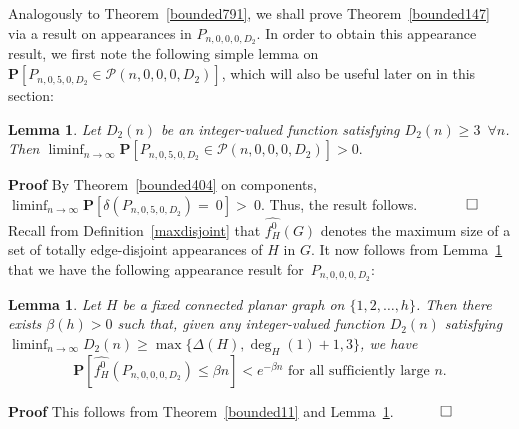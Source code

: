 \documentclass{article}
\newtheorem{Lemma}[Theorem]{Lemma}
\newtheorem{Proof of Theorem}{Proof of Theorem}
\begin{document}
Analogously to Theorem~\ref{bounded791},
we shall prove Theorem~\ref{bounded147} via a result on appearances in $P_{n,0,0,0,D_{2}}$.
In order to obtain this appearance result,
we first note the following simple lemma on
$\mathbf{P}[P_{n,0,5,0,D_{2}} \in \mathcal{P}(n,0,0,0,D_{2})]$,
which will also be useful later on in this section:















\begin{Lemma} \label{bounded811}
Let $D_{2}(n)$ be an integer-valued function satisfying $D_{2}(n) \geq 3$~$\forall n$.
Then $\liminf_{n \to \infty} \mathbf{P}[P_{n,0,5,0,D_{2}} \in \mathcal{P}(n,0,0,0,D_{2})]>0.$
\end{Lemma}
\textbf{Proof}
By Theorem~\ref{bounded404} on components,
$\liminf_{n \to \infty} \mathbf{P}[\delta(P_{n,0,5,0,D_{2}})=~0] >~0.$
Thus, the result follows.~$\phantom{qwerty} 
\setlength{\unitlength}{.25cm}
\begin{picture}(1,1)
\put(0,0){\line(1,0){1}}
\put(0,0){\line(0,1){1}}
\put(1,1){\line(-1,0){1}}
\put(1,1){\line(0,-1){1}}
\end{picture}$ \\















Recall from Definition~\ref{maxdisjoint} that
$\widehat{f_{H}^{0}}(G)$ denotes the maximum size of a set of totally edge-disjoint appearances of $H$ in $G$.
It now follows from Lemma~\ref{bounded811} that we have the following appearance result for~$P_{n,0,0,0,D_{2}}$:















\begin{Lemma} \label{bounded812}
Let $H$ be a fixed connected planar graph on $\{ 1,2, \ldots, h \}$.
Then there exists $\beta(h)>0$ such that,
given any integer-valued function $D_{2}(n)$ satisfying
$\liminf_{n \to \infty} D_{2}(n) \geq \max \{ \Delta(H), \deg_{H}(1)+1, 3 \}$,
we have
\begin{displaymath}
\mathbf{P}[\widehat{f_{H}^{0}} (P_{n,0,0,0,D_{2}}) \leq \beta n] < e^{- \beta n} 
\textrm{ for all sufficiently large } n.
\end{displaymath}
\end{Lemma}
\textbf{Proof}
This follows from Theorem~\ref{bounded11} and Lemma~\ref{bounded811}.
$\phantom{qwerty}
\setlength{\unitlength}{.25cm}
\begin{picture}(1,1)
\put(0,0){\line(1,0){1}}
\put(0,0){\line(0,1){1}}
\put(1,1){\line(-1,0){1}}
\put(1,1){\line(0,-1){1}}
\end{picture}$ 
\end{document}
